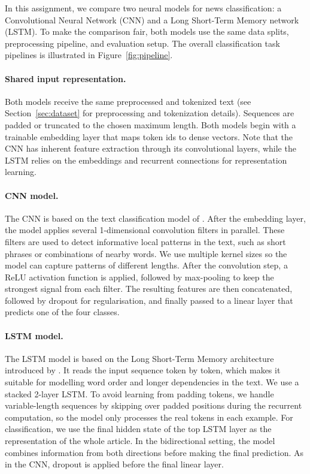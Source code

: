 In this assignment, we compare two neural models for news classification: a Convolutional Neural Network (CNN) and a Long Short-Term Memory network (LSTM). To make the comparison fair, both models use the same data splits, preprocessing pipeline, and evaluation setup. The overall classification task pipelines is illustrated in Figure~\ref{fig:pipeline}.



\paragraph{Shared input representation.}
Both models receive the same preprocessed and tokenized text (see Section~\ref{sec:dataset} for preprocessing and tokenization details). Sequences are padded or truncated to the chosen maximum length. Both models begin with a trainable embedding layer that maps token ids to dense vectors. Note that the CNN has inherent feature extraction through its convolutional layers, while the LSTM relies on the embeddings and recurrent connections for representation learning.

\paragraph{CNN model.}
The CNN is based on the text classification model of \cite{kim-2014-convolutional}. After the embedding layer, the model applies several 1-dimensional convolution filters in parallel. These filters are used to detect informative local patterns in the text, such as short phrases or combinations of nearby words. We use multiple kernel sizes so the model can capture patterns of different lengths. After the convolution step, a ReLU activation function is applied, followed by max-pooling to keep the strongest signal from each filter. The resulting features are then concatenated, followed by dropout for regularisation, and finally passed to a linear layer that predicts one of the four classes.

\paragraph{LSTM model.}
The LSTM model is based on the Long Short-Term Memory architecture introduced by \cite{hochreiter1997lstm}. It reads the input sequence token by token, which makes it suitable for modelling word order and longer dependencies in the text. We use a stacked 2-layer LSTM. To avoid learning from padding tokens, we handle variable-length sequences by skipping over padded positions during the recurrent computation, so the model only processes the real tokens in each example. For classification, we use the final hidden state of the top LSTM layer as the representation of the whole article. In the bidirectional setting, the model combines information from both directions before making the final prediction. As in the CNN, dropout is applied before the final linear layer.

